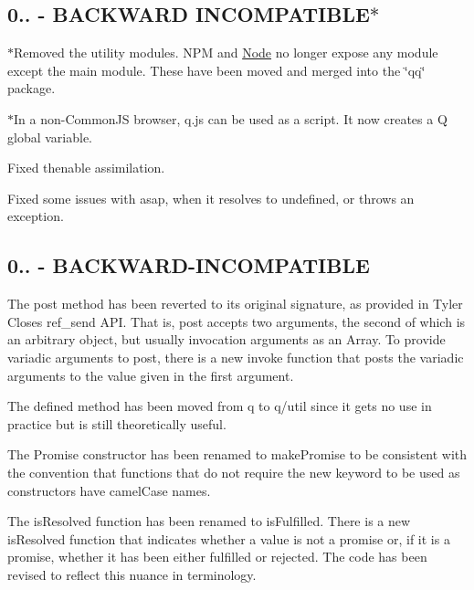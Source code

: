 \subsection*{0.. -\/ B\+A\+C\+K\+W\+A\+RD I\+N\+C\+O\+M\+P\+A\+T\+I\+B\+L\+E$\ast$}


\begin{DoxyItemize}
\item $\ast$\+Removed the utility modules. N\+PM and \mbox{\hyperlink{classNode}{Node}} no longer expose any module except the main module. These have been moved and merged into the \char`\"{}qq\char`\"{} package.
\item $\ast$\+In a non-\/\+Common\+JS browser, q.\+js can be used as a script. It now creates a Q global variable.
\item Fixed thenable assimilation.
\item Fixed some issues with asap, when it resolves to undefined, or throws an exception.
\end{DoxyItemize}

\subsection*{0.. -\/ B\+A\+C\+K\+W\+A\+R\+D-\/\+I\+N\+C\+O\+M\+P\+A\+T\+I\+B\+LE}


\begin{DoxyItemize}
\item The {\ttfamily post} method has been reverted to its original signature, as provided in Tyler Close\textquotesingle{}s {\ttfamily ref\+\_\+send} A\+PI. That is, {\ttfamily post} accepts two arguments, the second of which is an arbitrary object, but usually invocation arguments as an {\ttfamily Array}. To provide variadic arguments to {\ttfamily post}, there is a new {\ttfamily invoke} function that posts the variadic arguments to the value given in the first argument.
\item The {\ttfamily defined} method has been moved from {\ttfamily q} to {\ttfamily q/util} since it gets no use in practice but is still theoretically useful.
\item The {\ttfamily Promise} constructor has been renamed to {\ttfamily make\+Promise} to be consistent with the convention that functions that do not require the {\ttfamily new} keyword to be used as constructors have camel\+Case names.
\item The {\ttfamily is\+Resolved} function has been renamed to {\ttfamily is\+Fulfilled}. There is a new {\ttfamily is\+Resolved} function that indicates whether a value is not a promise or, if it is a promise, whether it has been either fulfilled or rejected. The code has been revised to reflect this nuance in terminology.
\end{DoxyItemize}

